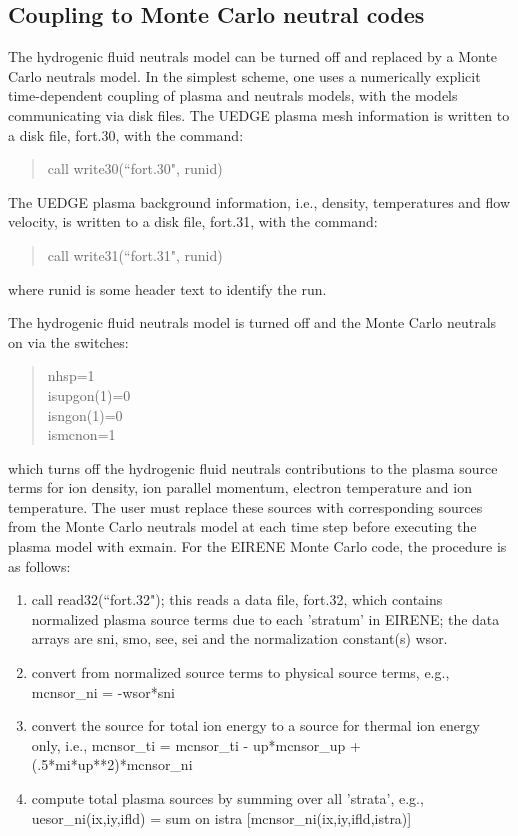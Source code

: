 \documentclass [12pt]{article}
\begin{document}
\subsection{Coupling to Monte Carlo neutral codes}

The hydrogenic fluid neutrals model can be turned off and replaced by
a Monte Carlo neutrals model.  In the simplest scheme, one uses a
numerically explicit time-dependent coupling of plasma and neutrals
models, with the models communicating via disk files.  The {\sf UEDGE}
plasma mesh information is written to a disk file, {\sf fort.30}, with the
command:
\begin{verse} \sf
        call write30(``fort.30", runid) 
\end{verse}
The {\sf UEDGE} plasma background information, i.e., density, temperatures
and flow velocity, is written to a disk file, {\sf fort.31}, with the
command:
\begin{verse} \sf
        call write31(``fort.31", runid)
\end{verse}
where runid is some header text to identify the run.

The hydrogenic fluid neutrals model is turned off and the
Monte Carlo neutrals on via the switches:
\begin{verse} \sf
        nhsp=1 \\
        isupgon(1)=0 \\
        isngon(1)=0 \\
        ismcnon=1
\end{verse}
which turns off the hydrogenic fluid neutrals contributions to the
plasma source terms for ion density, ion parallel momentum, electron
temperature and ion temperature.  The user must replace these sources
with corresponding sources from the Monte Carlo neutrals model at
each time step before executing the plasma model with {\sf exmain}.  
For the {\sf EIRENE} Monte Carlo code, the procedure is as follows:
\begin{enumerate}
       \item call read32(``fort.32"); this reads a data file, fort.32,
           which contains normalized plasma source terms due to each
           'stratum' in {\sf EIRENE}; the data arrays are sni, smo, see, sei
           and the normalization constant(s) wsor.
       \item convert from normalized source terms to physical source terms,
           e.g., mcnsor\_ni = -wsor*sni
       \item convert the source for total ion energy to a source for thermal
           ion energy only, i.e., mcnsor\_ti = mcnsor\_ti - up*mcnsor\_up +
           (.5*mi*up**2)*mcnsor\_ni
       \item  compute total plasma sources by summing over all 'strata', e.g.,
           uesor\_ni(ix,iy,ifld) = sum on istra [mcnsor\_ni(ix,iy,ifld,istra)]
\end{enumerate}
\end{document}
